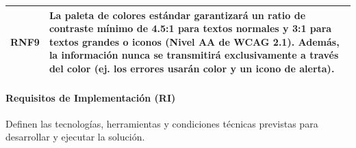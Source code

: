\begin{table}[H]
\begin{tabularx}{\textwidth}{|p{2.2cm}|X|}
\rowcolor{azulclaro}
\textbf{RNF9} & La paleta de colores estándar garantizará un ratio de contraste mínimo de 4.5:1 para textos normales y 3:1 para textos grandes o iconos (Nivel AA de WCAG 2.1). Además, la información nunca se transmitirá exclusivamente a través del color (ej. los errores usarán color y un icono de alerta). \\ \hline
\end{tabularx}
\end{table}

\vspace{0.6cm}

\paragraph{Requisitos de Implementación (RI)}
Definen las tecnologías, herramientas y condiciones técnicas previstas para desarrollar y ejecutar la solución.

